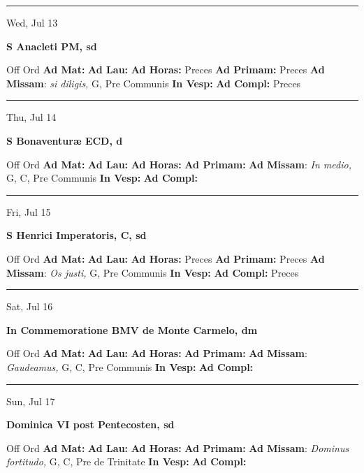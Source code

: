 \documentclass[letterpaper, 10pt]{article}
\begin{document}
\hrule
\begin{center}
Wed, Jul 13
\end{center}\textbf{ \large S Anacleti PM, \textnormal{\normalsize sd}}
\begin{justify}
Off Ord
\textbf{Ad Mat: }
\textbf{Ad Lau: }
\textbf{Ad Horas: }Preces
\textbf{Ad Primam: }Preces
\textbf{Ad Missam}: \textit{si diligis,} G, Pre Communis
\textbf{In Vesp: }
\textbf{Ad Compl: }Preces\end{justify}



\hrule
\begin{center}
Thu, Jul 14
\end{center}\textbf{ \large S Bonaventuræ ECD, \textnormal{\normalsize d}}
\begin{justify}
Off Ord
\textbf{Ad Mat: }
\textbf{Ad Lau: }
\textbf{Ad Horas: }
\textbf{Ad Primam: }
\textbf{Ad Missam}: \textit{In medio,} G, C, Pre Communis
\textbf{In Vesp: }
\textbf{Ad Compl: }\end{justify}



\hrule
\begin{center}
Fri, Jul 15
\end{center}\textbf{ \large S Henrici Imperatoris, C, \textnormal{\normalsize sd}}
\begin{justify}
Off Ord
\textbf{Ad Mat: }
\textbf{Ad Lau: }
\textbf{Ad Horas: }Preces
\textbf{Ad Primam: }Preces
\textbf{Ad Missam}: \textit{Os justi,} G, Pre Communis
\textbf{In Vesp: }
\textbf{Ad Compl: }Preces\end{justify}



\hrule
\begin{center}
Sat, Jul 16
\end{center}\textbf{ \large In Commemoratione BMV de Monte Carmelo, \textnormal{\normalsize dm}}
\begin{justify}
Off Ord
\textbf{Ad Mat: }
\textbf{Ad Lau: }
\textbf{Ad Horas: }
\textbf{Ad Primam: }
\textbf{Ad Missam}: \textit{Gaudeamus,} G, C, Pre Communis
\textbf{In Vesp: }
\textbf{Ad Compl: }\end{justify}



\hrule
\begin{center}
Sun, Jul 17
\end{center}\textbf{ \large Dominica VI post Pentecosten, \textnormal{\normalsize sd}}
\begin{justify}
Off Ord
\textbf{Ad Mat: }
\textbf{Ad Lau: }
\textbf{Ad Horas: }
\textbf{Ad Primam: }
\textbf{Ad Missam}: \textit{Dominus fortitudo,} G, C, Pre de Trinitate
\textbf{In Vesp: }
\textbf{Ad Compl: }\end{justify}
\end{document}
